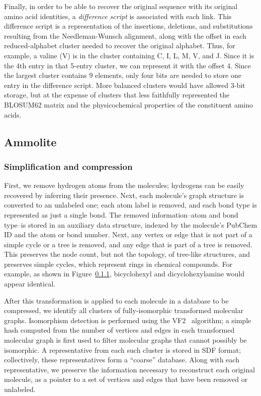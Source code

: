 \documentclass[review,preprint,12pt]{elsarticle}
\renewcommand{\cite}{\citep} %
\theoremstyle{definition}
\theoremstyle{remark}
\numberwithin{equation}{section}
\begin{document}
Finally, in order to be able to recover the original sequence with its original
amino acid identities, a \textit{difference script} is associated with each
link.
This difference script is a representation of the insertions, deletions, and
substitutions resulting from the Needleman-Wunsch alignment, along with the
offset in each reduced-alphabet cluster needed to recover the original alphabet.
Thus, for example, a valine (V) is in the cluster containing C, I, L, M, V, and 
J.
Since it is the 4th entry in that 5-entry cluster, we can represent it with
the offset 4.
Since the largest cluster contains 9 elements, only four bits are needed to
store one entry in the difference script.
More balanced clusters would have allowed 3-bit storage, but at the expense of
clusters that less faithfully represented the BLOSUM62 matrix and the
physicochemical properties of the constituent amino acids.

\subsection{Ammolite}

\subsubsection{Simplification and compression}

First, we remove hydrogen atoms from the molecules; hydrogens can be easily recovered by inferring their 
presence.
Next, each molecule's graph structure is converted to an unlabeled one; each atom label is removed, and each
bond type is represented as just a single bond.
The removed information--atom and bond type--is stored in an auxiliary data structure, indexed by the molecule's
PubChem ID and the atom or bond number.
Next, any vertex or edge that is not part of a simple cycle or a tree is removed, and any edge that is part
of a tree is removed.
This preserves the node count, but not the topology, of tree-like structures, and preserves simple cycles,
which represent rings in chemical compounds.
For example, as shown in Figure~\ref{}, bicyclohexyl and dicyclohexylamine would appear identical.

After this transformation is applied to each molecule in a database to be compressed, we identify all clusters
of fully-isomorphic transformed molecular graphs.
Isomorphism detection is performed using the VF2~\cite{Cordella} algorithm; a simple hash computed from the
number of vertices and edges in each transformed molecular graph is first used to filter molecular graphs that
cannot possibly be isomorphic.
A representative from each such cluster is stored in SDF format; collectively, these representatives form a 
``coarse'' database.
Along with each representative, we preserve the information necessary to reconstruct each original molecule,
as a pointer to a set of vertices and edges that have been removed or unlabeled.
\end{document}
